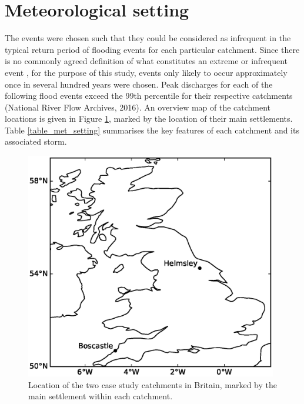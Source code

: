 \section{Meteorological setting}
The events were chosen such that they could be considered as infrequent in the typical return period of flooding events for each particular catchment. Since there is no commonly agreed definition of what constitutes an extreme or infrequent event \citep[e.g.][]{wilby2008climate,fowler2010detecting,jones2014objective,}, for the purpose of this study, events only likely to occur approximately once in several hundred years were chosen. Peak discharges for each of the following flood events exceed the 99th percentile for their respective catchments (National River Flow Archives, 2016).  An overview map of the catchment locations is given in Figure \ref{fig_location_map}, marked by the location of their main settlements. Table \ref{table_met_setting} summarises the key features of each catchment and its associated storm.

\begin{figure}[htb]
\includegraphics[width=11cm]{chp_events_figures_scripts/figure_location_map.eps}
\caption{Location of the two case study catchments in Britain, marked by the main settlement within each catchment.}
\label{fig_location_map}
\end{figure}

